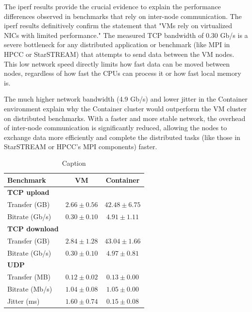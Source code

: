 The iperf results provide the crucial evidence to explain the performance differences observed in benchmarks that rely on inter-node communication. The iperf results definitively confirm the statement that "VMs rely on virtualized NICs with limited performance." The measured TCP bandwidth of 0.30 Gb/s is a severe bottleneck for any distributed application or benchmark (like MPI in HPCC or StarSTREAM) that attempts to send data between the VM nodes. This low network speed directly limits how fast data can be moved between nodes, regardless of how fast the CPUs can process it or how fast local memory is.

The much higher network bandwidth (4.9 Gb/s) and lower jitter in the Container environment explain why the Container cluster would outperform the VM cluster on distributed benchmarks. With a faster and more stable network, the overhead of inter-node communication is significantly reduced, allowing the nodes to exchange data more efficiently and complete the distributed tasks (like those in StarSTREAM or HPCC's MPI components) faster.

\begin{table}[H]
    \centering
    \begin{tabular}{lcc}
    \toprule
    \textbf{Benchmark} & \textbf{VM} & \textbf{Container} \\
    \midrule
    \textbf{TCP upload} & & \\
    Transfer (GB) & $2.66 \pm 0.56$ & $42.48 \pm 6.75$ \\
    Bitrate (Gb/s) & $0.30 \pm 0.10$ & $4.91 \pm 1.11$ \\
    \midrule
    \textbf{TCP download} & & \\
    Transfer (GB) & $2.84 \pm 1.28$ & $43.04 \pm 1.66$ \\
    Bitrate (Gb/s) & $0.30 \pm 0.10$ & $4.97 \pm 0.81$ \\
    \midrule
    \textbf{UDP} & & \\
    Transfer (MB) & $0.12 \pm 0.02$ & $0.13 \pm 0.00$ \\
    Bitrate (Mb/s) & $1.04 \pm 0.08$ & $1.05 \pm 0.00$ \\
    Jitter (ms) & $1.60 \pm 0.74$ & $0.15 \pm 0.08$ \\
    \bottomrule
    \end{tabular}
    \caption{Caption}
    \label{tab:iperf}
\end{table}